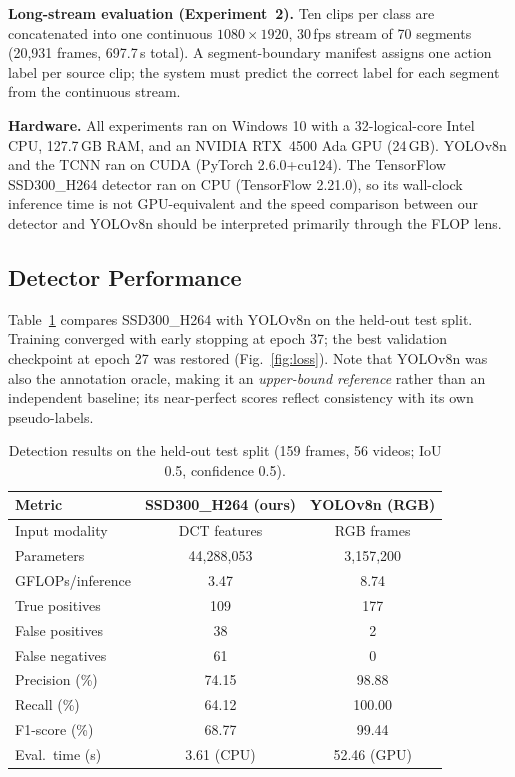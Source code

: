 \documentclass[conference]{IEEEtran}
\begin{document}
\textbf{Long-stream evaluation (Experiment~2).} Ten clips per class are concatenated into one continuous $1080\!\times\!1920$, 30\,fps stream of 70 segments (20{,}931 frames, 697.7\,s total). A segment-boundary manifest assigns one action label per source clip; the system must predict the correct label for each segment from the continuous stream.

\textbf{Hardware.} All experiments ran on Windows 10 with a 32-logical-core Intel CPU, 127.7\,GB RAM, and an NVIDIA RTX~4500 Ada GPU (24\,GB). YOLOv8n and the TCNN ran on CUDA (PyTorch 2.6.0+cu124). The TensorFlow SSD300\_H264 detector ran on CPU (TensorFlow 2.21.0), so its wall-clock inference time is not GPU-equivalent and the speed comparison between our detector and YOLOv8n should be interpreted primarily through the FLOP lens.

\subsection{Detector Performance}

Table~\ref{tab:det} compares SSD300\_H264 with YOLOv8n on the held-out test split. Training converged with early stopping at epoch 37; the best validation checkpoint at epoch 27 was restored (Fig.~\ref{fig:loss}). Note that YOLOv8n was also the annotation oracle, making it an \emph{upper-bound reference} rather than an independent baseline; its near-perfect scores reflect consistency with its own pseudo-labels.

\begin{table}[t]
\caption{Detection results on the held-out test split (159 frames, 56 videos; IoU 0.5, confidence 0.5).}
\label{tab:det}
\centering
\begin{tabular}{lcc}
\toprule
Metric & SSD300\_H264 (ours) & YOLOv8n (RGB) \\
\midrule
Input modality    & DCT features       & RGB frames \\
Parameters        & 44,288,053         & 3,157,200  \\
GFLOPs/inference  & 3.47               & 8.74       \\
True positives    & 109                & 177        \\
False positives   & 38                 & 2          \\
False negatives   & 61                 & 0          \\
Precision (\%)    & 74.15              & 98.88      \\
Recall (\%)       & 64.12              & 100.00     \\
F1-score (\%)     & 68.77              & 99.44      \\
Eval.\ time (s)   & 3.61 (CPU)         & 52.46 (GPU)\\
\bottomrule
\end{tabular}
\end{table}
\end{document}
